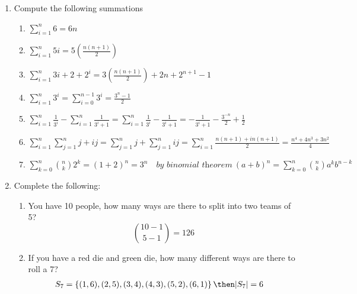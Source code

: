 \documentclass[basic, header]{nosvagor-notes}
\begin{document}
\begin{enumerate}

  \item Compute the following summations
    \begin{enumerate}
      \item \(\displaystyle \sum_{i=1}^{n} 6 = 6n\)

      \item \(\displaystyle \sum_{i=1}^{n} 5i = 5\left( \frac{n(n+1)}{2} \right) \)

      \item \(\displaystyle \sum_{i=1}^{n} 3i + 2 + 2^i =
        3\left(\frac{n(n+1)}{2}\right) + 2n + 2^{n+1}-1
        \)

      \item \(\displaystyle \sum_{i=1}^{n} 3^i = \sum_{i=0}^{n-1} 3^i = \frac{3^{n}-1}{2} \)

      \item \(\displaystyle \sum_{i=1}^{n} \frac{1}{3^i} - \sum_{i=1}^{n} \frac{1}{3^i + 1}
        = \sum_{i=1}^{n} \frac{1}{3^i} - \frac{1}{3^i + 1}
        = -\frac{1}{3^i + 1} - \frac{3^{-n}}{2} + \frac{1}{2}
        \)

      \item \(\displaystyle \sum_{i=1}^{n} \sum_{j=1}^{n} j + ij
        = \sum_{j=1}^{n} j + \sum_{j=1}^{n} ij
        = \sum_{i=1}^{n} \frac{n(n+1)+ in(n+1)}{2}
        = \frac{n^4+4n^3+3n^2}{4}
        \)

      \item \(\displaystyle \sum_{k=0}^{n} {n \choose k} 2^k
        = \left(1+2\right)^n = 3^n \quad \textit{by binomial theorem}~(a+b)^n = \sum_{k=0}^{n} {n \choose k} a^k b^{n-k}
        \)
    \end{enumerate}

  \newpage %

  \item Complete the following:

    \begin{enumerate}
      \item You have 10 people, how many ways are there to split into two teams of 5?
        \[%
          {10-1 \choose 5-1} = 126
        \]%

      \item If you have a red die and green die, how many different ways are there to roll a 7?
        \begin{align*}
          S_7 &= \left\{ (1,6), (2,5), (3,4), (4,3), (5,2), (6,1) \right\} \then |S_7| = 6
        \end{align*}


\end{enumerate}
\end{enumerate}
\end{document}
